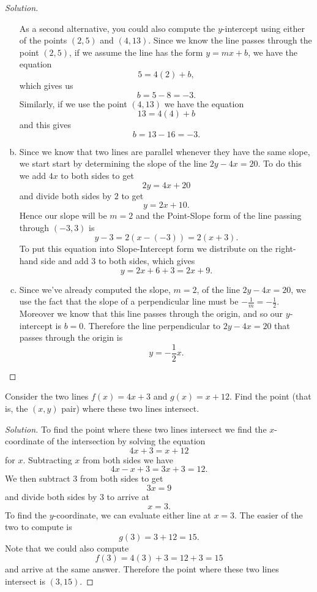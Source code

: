 \documentclass[12pt]{amsart}
\begin{document}
\begin{thm}[16 Points]
\begin{proof}[Solution]
\begin{enumerate}[(a)]
      As a second alternative, you could also compute the $y$-intercept using either of the points $(2,5)$ and $(4,13)$.
      Since we know the line passes through the point $(2,5)$, if we assume the line has the form $y = mx + b$, we have the equation
      $$5 = 4(2) + b,$$
      which gives us $$b = 5 - 8 = -3.$$
      Similarly, if we use the point $(4,13)$ we have the equation
      $$13 = 4(4) + b$$
      and this gives $$b = 13 - 16 = -3.$$
    \item
      Since we know that two lines are parallel whenever they have the same slope, we start start by determining the slope of the line $2y - 4x = 20$.
      To do this we add $4x$ to both sides to get 
      $$2y = 4x + 20$$
      and divide both sides by $2$ to get
      $$y = 2x + 10.$$
      Hence our slope will be $m = 2$ and the Point-Slope form of the line passing through $(-3,3)$ is 
      $$y - 3 = 2(x - (-3)) = 2(x + 3).$$
      To put this equation into Slope-Intercept form we distribute on the right-hand side and add $3$ to both sides, which gives
      $$y = 2x + 6 + 3 = 2x + 9.$$
    \item
      Since we've already computed the slope, $m = 2$, of the line $2y - 4x = 20$, we use the fact that the slope of a perpendicular line must be $-\frac{1}{m} = -\frac{1}{2}$.
      Moreover we know that this line passes through the origin, and so our $y$-intercept is $b = 0$.
      Therefore the line perpendicular to $2y - 4x = 20$ that passes through the origin is
      $$y = -\frac{1}{2}x.$$
    \end{enumerate}
  \end{proof}
\end{thm}


\begin{thm}[16 Points]\label{ex10}
  Consider the two lines $f(x) = 4x + 3$ and $g(x) = x + 12$.
  Find the point (that is, the $(x,y)$ pair) where these two lines intersect.
  
  \begin{proof}[Solution]
    To find the point where these two lines intersect we find the $x$-coordinate of the intersection by solving the equation
    $$4x + 3 = x + 12$$
    for $x$.
    Subtracting $x$ from both sides we have
    $$4x - x + 3 = 3x + 3 = 12.$$
    We then subtract $3$ from both sides to get 
    $$3x = 9$$
    and divide both sides by $3$ to arrive at 
    $$x = 3.$$
    To find the $y$-coordinate, we can evaluate either line at $x = 3$.
    The easier of the two to compute is 
    $$g(3) = 3 + 12 = 15.$$
    Note that we could also compute
    $$f(3) = 4(3) + 3 = 12 + 3 = 15$$
    and arrive at the same answer.
    Therefore the point where these two lines intersect is $(3, 15)$.
  \end{proof}
\end{thm}
\end{document}
